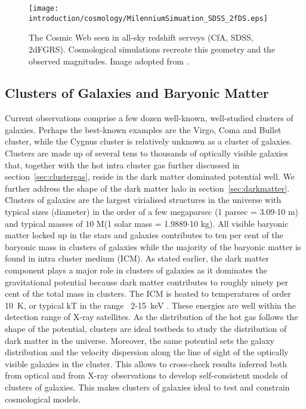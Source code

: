 \documentclass[MScProj_TLRH_ClusterEnergy.tex]{subfiles}
\begin{document}
\begin{figure}
\centering
\texttt{[image: introduction/cosmology/MilenniumSimuation\_SDSS\_2fDS.eps]}
\caption{The Cosmic Web seen in all-sky redshift serveys (CfA, SDSS, 2dFGRS).
         Cosmological simulations recreate this geometry and the observed
         magnitudes. Image adopted from \citet{2006Natur.440.1137S}.}
\label{fig:cosmicweb}
\end{figure}

\subsection*{Clusters of Galaxies and Baryonic Matter}
\label{sec:clusterbaryons}

Current observations comprise a few dozen well-known, well-studied clusters of
galaxies. Perhaps the best-known examples are the Virgo, Coma and Bullet cluster,
while the Cygnus cluster is relatively unknown as a cluster of galaxies.
Clusters are made up of several tens to thousands of optically visible 
galaxies that, together with the hot intra cluster gas further discussed in 
section~\ref{sec:clustergas}, reside in the dark matter dominated potential
well. We further address the shape of the dark matter halo in 
section~\ref{sec:darkmatter}. Clusters of galaxies are the
largest virialised structures in the universe with typical sizes (diameter) in 
the order of a few megaparsec (1 parsec = 3.09$\cdot$10 m) and typical 
masses of 10 M\Sun (1 solar mass = 1.9889$\cdot$10 kg). All
visible baryonic matter locked up in the stars and galaxies contributes to 
\mytilde ten per cent of the baryonic mass in clusters of galaxies while the 
majority of the baryonic matter is found in intra cluster medium (ICM). As stated
earlier, the dark matter component plays a major role in clusters of galaxies as
it dominates the gravitational potential because dark matter contributes to roughly
ninety per cent of the total mass in clusters. The ICM is heated to 
temperatures of order 10~K, or typical kT in the range \mytilde~2-15~keV 
\citep{2007ARA&A..45..117M}. These energies are
well within the detection range of X-ray satellites. As the distribution of the
hot gas follows the shape of the potential, clusters are ideal testbeds to study 
the distribution of dark matter in the universe. Moreover, the same potential sets
the galaxy distribution and the velocity dispersion along the line of sight of 
the optically visible galaxies in the cluster. This allows to cross-check results
inferred both from optical and from X-ray observations to develop self-consistent 
models of clusters of galaxies. This makes clusters of galaxies ideal to 
test and constrain cosmological models.
\end{document}
